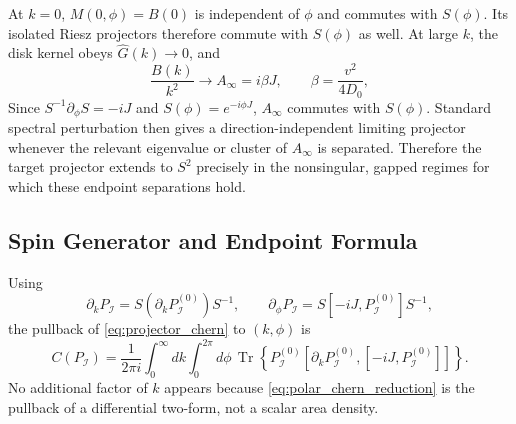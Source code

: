 \documentclass[11pt]{article}
\numberwithin{equation}{section}
\begin{document}
At $k=0$, $M(0,\phi)=B(0)$ is independent of $\phi$ and commutes with
$S(\phi)$. Its isolated Riesz projectors therefore commute with
$S(\phi)$ as well. At large $k$, the disk kernel obeys
$\widehat G(k)\to0$, and
\begin{equation}
  \frac{B(k)}{k^2}\longrightarrow
  A_\infty=i\beta J,
  \qquad
  \beta=\frac{v^2}{4D_0},
  \label{eq:normalized_infinity_matrix}
\end{equation}
Since $S^{-1}\partial_\phi S=-iJ$ and $S(\phi)=e^{-i\phi J}$,
$A_\infty$ commutes with $S(\phi)$. Standard spectral perturbation then
gives a direction-independent limiting
projector whenever the relevant eigenvalue or cluster of $A_\infty$ is
separated. Therefore the target projector extends to $S^2$ precisely in
the nonsingular, gapped regimes for which these endpoint separations hold.

\subsection{Spin Generator and Endpoint Formula}

Using
\begin{equation}
  \partial_kP_{\mathcal I}
  =S(\partial_kP_{\mathcal I}^{(0)})S^{-1},
  \qquad
  \partial_\phi P_{\mathcal I}
  =S[-iJ,P_{\mathcal I}^{(0)}]S^{-1},
  \label{eq:projector_polar_derivatives}
\end{equation}
the pullback of \eqref{eq:projector_chern} to $(k,\phi)$ is
\begin{equation}
  C(P_{\mathcal I})=\frac{1}{2\pi i}
  \int_0^\infty dk\int_0^{2\pi}d\phi\,
  \operatorname{Tr}\!\left\{
  P_{\mathcal I}^{(0)}
  [\partial_kP_{\mathcal I}^{(0)},[-iJ,P_{\mathcal I}^{(0)}]]
  \right\}.
  \label{eq:polar_chern_reduction}
\end{equation}
No additional factor of $k$ appears because
\eqref{eq:polar_chern_reduction} is the pullback of a differential
two-form, not a scalar area density.
\end{document}
